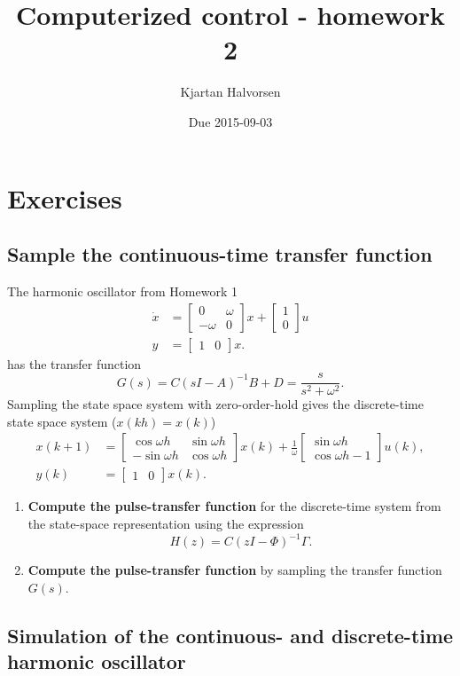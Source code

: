 \documentclass{scrartcl}
\title{Computerized control - homework 2}
\author{Kjartan Halvorsen}
\date{Due 2015-09-03}
\newcommand*{\bbm}{\begin{bmatrix}}
\newcommand*{\ebm}{\end{bmatrix}}
\begin{document}
\maketitle


\section{Exercises}
\label{sec-1}
\subsection{Sample the continuous-time transfer function}
\label{sec-1-1}

   The harmonic oscillator from Homework 1
\begin{align*}
\dot{x} &= \begin{bmatrix} 0 & \omega\\-\omega & 0 \end{bmatrix} x + \begin{bmatrix}1\\0\end{bmatrix} u\\
y &= \begin{bmatrix} 1 & 0 \end{bmatrix} x.
\end{align*} 
has the transfer function 
\[ G(s) = C(sI-A)^{-1}B + D = \frac{s}{s^2 + \omega^2}. \]
Sampling the state space system with zero-order-hold gives the discrete-time state space system ($x(kh) = x(k)$)
\begin{align*}
x(k+1) &= \bbm \cos \omega h & \sin \omega h\\ -\sin \omega h & \cos \omega h \ebm x(k) + 
          \frac{1}{\omega} \bbm \sin \omega h \\ \cos \omega h - 1 \ebm u(k), \\
y(k) &= \bbm 1 & 0 \ebm x(k).
\end{align*}

\begin{enumerate}
\item \textbf{Compute the pulse-transfer function} for the discrete-time system from the state-space representation using the expression \[ H(z) = C(zI-\Phi)^{-1}\Gamma. \]
\item \textbf{Compute the pulse-transfer function} by sampling the transfer function $G(s)$.
\end{enumerate}
\subsection{Simulation of the continuous- and discrete-time harmonic oscillator}
\label{sec-1-2}
\end{document}
